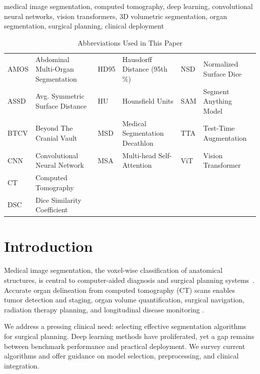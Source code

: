 \documentclass[conference]{IEEEtran}
\begin{document}
\begin{IEEEkeywords}
medical image segmentation, computed tomography, deep learning, convolutional neural networks, vision transformers, 3D volumetric segmentation, organ segmentation, surgical planning, clinical deployment
\end{IEEEkeywords}

\begin{table}[!htb]
\centering
\footnotesize
\caption{Abbreviations Used in This Paper}
\begin{tabular}{@{}ll|ll|ll@{}}
\toprule
AMOS & Abdominal Multi-Organ Segmentation & HD95 & Hausdorff Distance (95th \%) & NSD & Normalized Surface Dice \\
ASSD & Avg. Symmetric Surface Distance & HU & Hounsfield Units & SAM & Segment Anything Model \\
BTCV & Beyond The Cranial Vault & MSD & Medical Segmentation Decathlon & TTA & Test-Time Augmentation \\
CNN & Convolutional Neural Network & MSA & Multi-head Self-Attention & ViT & Vision Transformer \\
CT & Computed Tomography & & & & \\
DSC & Dice Similarity Coefficient & & & & \\
\bottomrule
\end{tabular}
\end{table}

\section{Introduction}
\label{sec:introduction}

Medical image segmentation, the voxel-wise classification of anatomical structures, is central to computer-aided diagnosis and surgical planning systems~\cite{litjens2017survey}. Accurate organ delineation from computed tomography (CT) scans enables tumor detection and staging, organ volume quantification, surgical navigation, radiation therapy planning, and longitudinal disease monitoring \cite{hesamian2019deep}.

We address a pressing clinical need: selecting effective segmentation algorithms for surgical planning. Deep learning methods have proliferated, yet a gap remains between benchmark performance and practical deployment. We survey current algorithms and offer guidance on model selection, preprocessing, and clinical integration.
\end{document}
